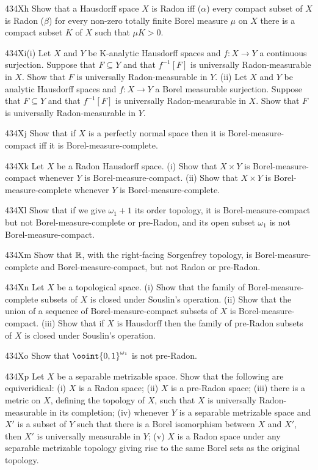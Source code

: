 {\spheader 434Xh Show that a Hausdorff space $X$ is Radon iff ($\alpha$)
every compact subset of $X$ is Radon ($\beta$) for every non-zero
totally finite Borel measure $\mu$ on $X$ there is a compact subset $K$
of $X$ such that $\mu K>0$.   

\sqheader 434Xi(i) Let $X$ and $Y$ be K-analytic Hausdorff spaces and
$f:X\to Y$ a continuous surjection.   Suppose that $F\subseteq Y$ and
that $f^{-1}[F]$ is universally Radon-measurable in $X$.   Show that $F$
is universally Radon-measurable in $Y$.   
(ii) Let $X$ and $Y$ be analytic Hausdorff spaces and $f:X\to Y$ a Borel
measurable surjection.
Suppose that $F\subseteq Y$ and that $f^{-1}[F]$ is universally
Radon-measurable in $X$.   Show that $F$ is universally Radon-measurable
in $Y$.   

\spheader 434Xj Show that if $X$ is a perfectly normal space then it is
Borel-measure-compact iff it is Borel-measure-complete.

\spheader 434Xk Let $X$ be a Radon Hausdorff space.   (i) Show that $X\times Y$ is
Borel-measure-compact whenever $Y$ is Borel-measure-compact.   (ii) Show that 
$X\times Y$ is Borel-measure-complete whenever $Y$ is Borel-measure-complete.   

\spheader 434Xl Show that if we give $\omega_1+1$ its order topology, it
is Borel-measure-compact but not Borel-measure-complete or pre-Radon,
and its open subset $\omega_1$ is not Borel-measure-compact.

\spheader 434Xm Show that $\Bbb R$, with the right-facing Sorgenfrey
topology, is Borel-measure-complete and Borel-measure-compact, but not
Radon or pre-Radon.

\spheader 434Xn Let $X$ be a topological space.   (i) Show that the
family of Borel-measure-complete subsets of $X$ is closed under
Souslin's operation.
(ii) Show that the union of a sequence of Borel-measure-compact subsets
of $X$ is Borel-measure-compact.
(iii) Show that if $X$ is Hausdorff then the family of pre-Radon subsets
of $X$ is closed under Souslin's operation.   

\spheader 434Xo Show that $\ooint{0,1}^{\omega_1}$ is not pre-Radon.

\spheader 434Xp Let $X$ be a separable metrizable space.   Show that the following 
are equiveridical:  (i) $X$ is a Radon space;  (ii) $X$ is a pre-Radon space;   
(iii) there is a metric on $X$, defining the topology of $X$, such that $X$ is 
universally Radon-measurable in its completion;  (iv) whenever $Y$ is a separable 
metrizable space and $X'$ is a subset of $Y$ such that there is a Borel isomorphism 
between $X$ and $X'$, then $X'$ is universally measurable in $Y$;  (v) $X$ is a Radon 
space under any separable metrizable topology giving rise to the same Borel sets as 
the original topology.

}
